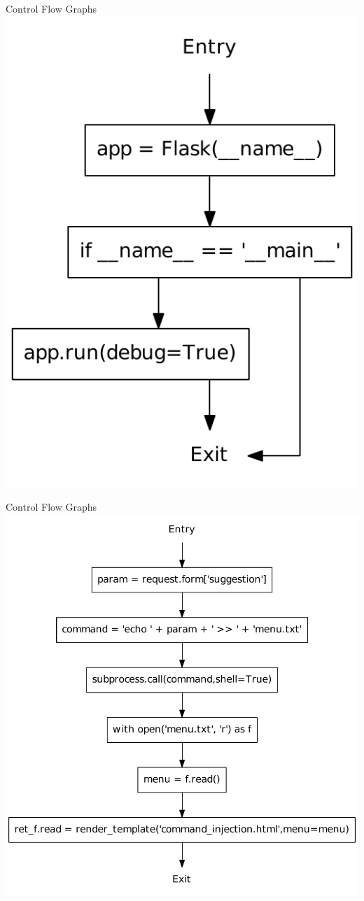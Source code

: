 \begin{frame}{Control Flow Graphs}
    \center
    \includegraphics[height=0.8\textheight]{graphics/CFG_module}
\end{frame}

\begin{frame}{Control Flow Graphs}
  \center
  \includegraphics[height=0.75\textheight]{graphics/CFG_menu}
\end{frame}

